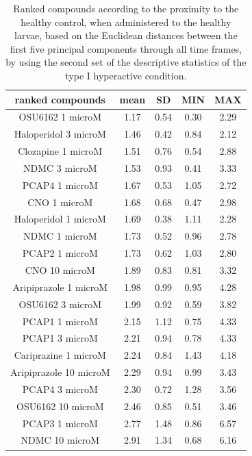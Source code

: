 \documentclass[a4paper,12pt]{article}
\begin{document}
\begin{table}[h!]\tiny
\centering
\caption{Ranked compounds according to the proximity to the healthy control, when administered to the healthy larvae, based on the Euclidean distances between the first five principal components through all time frames, by using the second set of the descriptive statistics of the type I hyperactive condition.}
\begin{tabular}{|c|c|c|c|c|}
\hline
ranked compounds             & mean & SD   & MIN  & MAX   \\ \hline
OSU6162 1 microM       & 1.17 & 0.54 & 0.30  & 2.29  \\ \hline
Haloperidol 3 microM   & 1.46 & 0.42 & 0.84 & 2.12  \\ \hline
Clozapine 1 microM     & 1.51 & 0.76 & 0.54 & 2.88  \\ \hline
NDMC 3 microM          & 1.53 & 0.93 & 0.41 & 3.33  \\ \hline
PCAP4 1 microM       & 1.67 & 0.53 & 1.05 & 2.72  \\ \hline
CNO 1 microM           & 1.68 & 0.68 & 0.47 & 2.98  \\ \hline
Haloperidol 1 microM   & 1.69 & 0.38 & 1.11 & 2.28  \\ \hline
NDMC 1 microM          & 1.73 & 0.52 & 0.96 & 2.78  \\ \hline
PCAP2 1 microM         & 1.73 & 0.62 & 1.03 & 2.80   \\ \hline
CNO 10 microM          & 1.89 & 0.83 & 0.81 & 3.32  \\ \hline
Aripiprazole 1 microM  & 1.98 & 0.99 & 0.95 & 4.28  \\ \hline
OSU6162 3 microM       & 1.99 & 0.92 & 0.59 & 3.82  \\ \hline
PCAP1 1 microM         & 2.15 & 1.12 & 0.75 & 4.33  \\ \hline
PCAP1 3 microM         & 2.21 & 0.94 & 0.78 & 4.33  \\ \hline
Cariprazine 1 microM   & 2.24 & 0.84 & 1.43 & 4.18  \\ \hline
Aripiprazole 10 microM & 2.29 & 0.94 & 0.99 & 3.43  \\ \hline
PCAP4 3 microM       & 2.30  & 0.72 & 1.28 & 3.56  \\ \hline
OSU6162 10 microM      & 2.46 & 0.85 & 0.51 & 3.46  \\ \hline
PCAP3 1 microM       & 2.77 & 1.48 & 0.86 & 6.57  \\ \hline
NDMC 10 microM         & 2.91 & 1.34 & 0.68 & 6.16  \\ \hline

\end{tabular}
\end{table}
\end{document}
